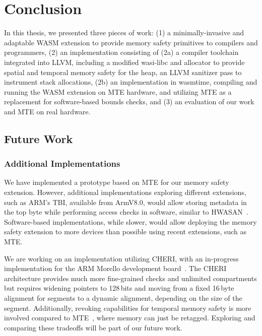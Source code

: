 \chapter{Conclusion}
\label{ch:conclusion}

In this thesis, we presented three pieces of work:
(1) a minimally-invasive and adaptable \ac{WASM} extension to provide memory safety primitives to compilers and programmers,
(2) an implementation consisting of (2a) a compiler toolchain integrated into LLVM, including a modified wasi-libc and allocator to provide spatial and temporal memory safety for the heap, an LLVM sanitizer pass to instrument stack allocations,
(2b) an implementation in wasmtime, compiling and running the \ac{WASM} extension on \ac{MTE} hardware, and utilizing \ac{MTE} as a replacement for software-based bounds checks,
and (3) an evaluation of our work and \ac{MTE} on real hardware.

\section{Future Work}
\label{sec:future-work}

\subsection{Additional Implementations}
\label{subsec:additional-implementations}

We have implemented a prototype based on \ac{MTE} for our memory safety extension.
However, additional implementations exploring different extensions, such as ARM's \ac{TBI}, available from ArmV8.0, would allow storing metadata in the top byte while performing access checks in software, similar to \ac{HWASAN}~\cite{serebryany2018memory}.
Software-based implementations, while slower, would allow deploying the memory safety extension to more devices than possible using recent extensions, such as \ac{MTE}.

We are working on an implementation utilizing \ac{CHERI}, with an in-progress implementation for the ARM Morello development board~\cite{UCAM-CL-TR-982}.
The CHERI architecture provides much more fine-grained checks and unlimited compartments but requires widening pointers to 128\,bits and moving from a fixed 16\,byte alignment for segments to a dynamic alignment, depending on the size of the segment.
Additionally, revoking capabilities for temporal memory safety is more involved compared to \ac{MTE}~\cite{xia2019cherivoke}, where memory can just be retagged.
Exploring and comparing these tradeoffs will be part of our future work.

